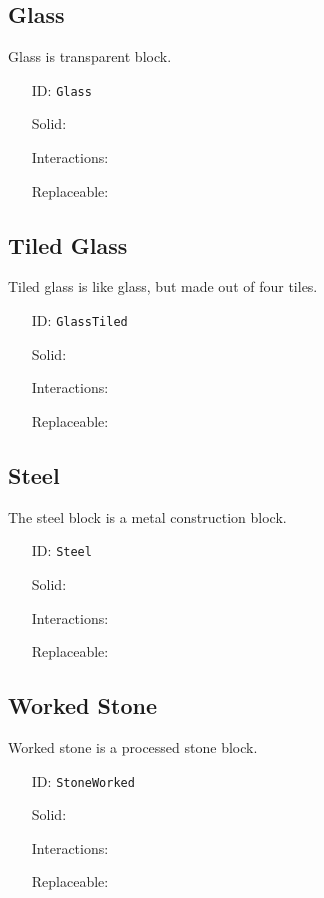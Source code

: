 \subsection{Glass}\label{subsec:blocks_glass}
Glass is transparent block.
\newline
\begin{itemize}[nosep]
    \item[ID:] \texttt{Glass}
    \item[Solid:]  \Checkmark \item[Interactions:]  \XSolidBrush \item[Replaceable:]  \XSolidBrush
\end{itemize}

\subsection{Tiled Glass}\label{subsec:blocks_tiled glass}
Tiled glass is like glass, but made out of four tiles.
\newline
\begin{itemize}[nosep]
    \item[ID:] \texttt{GlassTiled}
    \item[Solid:]  \Checkmark \item[Interactions:]  \XSolidBrush \item[Replaceable:]  \XSolidBrush
\end{itemize}

\subsection{Steel}\label{subsec:blocks_steel}
The steel block is a metal construction block.
\newline
\begin{itemize}[nosep]
    \item[ID:] \texttt{Steel}
    \item[Solid:]  \Checkmark \item[Interactions:]  \XSolidBrush \item[Replaceable:]  \XSolidBrush
\end{itemize}

\subsection{Worked Stone}\label{subsec:blocks_worked stone}
Worked stone is a processed stone block.
\newline
\begin{itemize}[nosep]
    \item[ID:] \texttt{StoneWorked}
    \item[Solid:]  \Checkmark \item[Interactions:]  \XSolidBrush \item[Replaceable:]  \XSolidBrush
\end{itemize}

